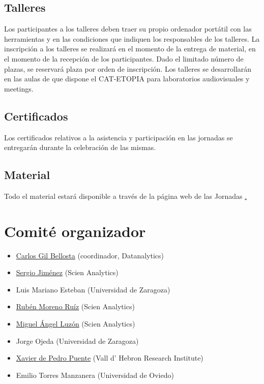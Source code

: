 \section{Talleres}

Los participantes a los talleres deben traer su propio ordenador portátil 
con las herramientas y en las condiciones que indiquen los responsables de 
los talleres. La inscripción a los talleres se realizará en el momento de 
la entrega de material, en el momento de la recepción de los participantes. 
Dado el limitado número de plazas, se reservará plaza por orden de inscripción. 
Los talleres se desarrollarán en las aulas de que dispone el CAT-ETOPIA 
para laboratorios audiovisuales y meetings.


\section{Certificados}

Los certificados relativos a la asistencia y participación en las jornadas
se entregarán durante la celebración de las mismas.


\section{Material}

Todo el material estará disponible a través de la página web de las Jornadas 
\href{http://r-es.org/V+Jornadas}. 



\chapter{Comité organizador}

\begin{itemize}

\item \href{http://www.datanalytics.com}{Carlos Gil Bellosta}
  (coordinador, Datanalytics)
\item \href{http://www.scien-analytics.com}{Sergio Jiménez} (Scien Analytics)
\item Luis Mariano Esteban (Universidad de Zaragoza)
\item \href{http://www.scien-analytics.com}{Rubén Moreno Ruíz} (Scien Analytics)
\item \href{[http://www.scien-analytics.com}{Miguel Ángel Luzón} (Scien Analytics)
\item Jorge Ojeda (Universidad de Zaragoza)
\item \href{http://ueb.vhir.org|Vall d'Hebron Research Institute}{Xavier de Pedro Puente} (Vall d' Hebron Research Institute)
\item  Emilio Torres Manzanera (Universidad de Oviedo)
\end{itemize}

